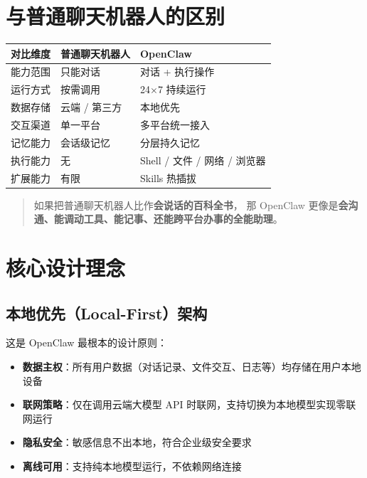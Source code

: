 \section{与普通聊天机器人的区别}

\begin{center}
\begin{tabular}{lll}
\toprule
\textbf{对比维度} & \textbf{普通聊天机器人} & \textbf{OpenClaw} \\
\midrule
能力范围 & 只能对话 & 对话 + 执行操作 \\
运行方式 & 按需调用 & 24$\times$7 持续运行 \\
数据存储 & 云端 / 第三方 & 本地优先 \\
交互渠道 & 单一平台 & 多平台统一接入 \\
记忆能力 & 会话级记忆 & 分层持久记忆 \\
执行能力 & 无 & Shell / 文件 / 网络 / 浏览器 \\
扩展能力 & 有限 & Skills 热插拔 \\
\bottomrule
\end{tabular}
\end{center}

\begin{quote}
如果把普通聊天机器人比作\textbf{会说话的百科全书}，
那 OpenClaw 更像是\textbf{会沟通、能调动工具、能记事、还能跨平台办事的全能助理}。
\end{quote}

\section{核心设计理念}

\subsection*{本地优先（Local-First）架构}

这是 OpenClaw 最根本的设计原则：

\begin{itemize}
  \item \textbf{数据主权}：所有用户数据（对话记录、文件交互、日志等）均存储在用户本地设备
  \item \textbf{联网策略}：仅在调用云端大模型 API 时联网，支持切换为本地模型实现零联网运行
  \item \textbf{隐私安全}：敏感信息不出本地，符合企业级安全要求
  \item \textbf{离线可用}：支持纯本地模型运行，不依赖网络连接
\end{itemize}

